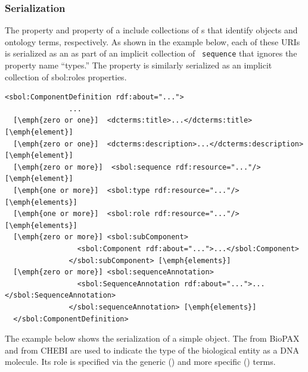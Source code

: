 \subsubsection*{Serialization}
The  property and  property of a  include collections of s that identify  objects and ontology terms, respectively. As shown in the example below, each of these URIs is serialized as an  as part of an implicit collection of {\tt \color{blue} sequence} that ignores the property name ``types.'' The  property is similarly serialized as an implicit collection of sbol:roles properties.


\begin{lstlisting}
<sbol:ComponentDefinition rdf:about="...">
               ...
  [\emph{zero or one}]  <dcterms:title>...</dcterms:title> [\emph{element}]
  [\emph{zero or one}]  <dcterms:description>...</dcterms:description> [\emph{element}]
  [\emph{zero or more}]  <sbol:sequence rdf:resource="..."/> [\emph{element}]
  [\emph{one or more}]  <sbol:type rdf:resource="..."/> [\emph{elements}]
  [\emph{one or more}]  <sbol:role rdf:resource="..."/> [\emph{elements}]    
  [\emph{zero or more}] <sbol:subComponent>
                 <sbol:Component rdf:about="...">...</sbol:Component>
               </sbol:subComponent> [\emph{elements}]
  [\emph{zero or more}] <sbol:sequenceAnnotation>
                 <sbol:SequenceAnnotation rdf:about="...">...</sbol:SequenceAnnotation>
               </sbol:sequenceAnnotation> [\emph{elements}]        
  </sbol:ComponentDefinition>
\end{lstlisting}

The example below shows the serialization of a simple  object. The  from BioPAX and  from CHEBI are used to indicate the type of the biological entity as a DNA molecule. Its role is specified via the generic  () and more specific  () terms.

